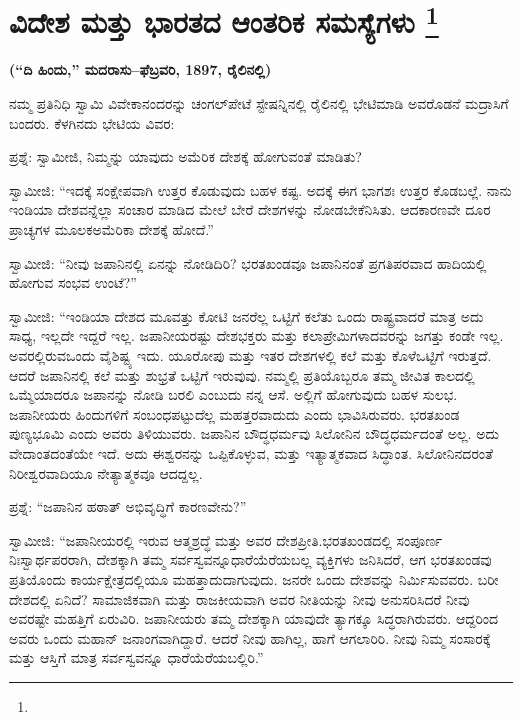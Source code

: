 
\chapter[ವಿದೇಶ ಮತ್ತು ಭಾರತದ ಆಂತರಿಕ ಸಮಸ್ಯೆಗಳು ]{ವಿದೇಶ ಮತ್ತು ಭಾರತದ ಆಂತರಿಕ ಸಮಸ್ಯೆಗಳು \protect\footnote{}}

\centerline{\textbf{(“ದಿ ಹಿಂದು,” ಮದರಾಸು–ಫೆಬ್ರವರಿ, 1897, ರೈಲಿನಲ್ಲಿ)}}

\vskip 0.4cm

ನಮ್ಮ ಪ್ರತಿನಿಧಿ ಸ್ವಾಮಿ ವಿವೇಕಾನಂದರನ್ನು ಚಂಗಲ್​ಪೇಟೆ ಸ್ಟೇಷನ್ನಿನಲ್ಲಿ ರೈಲಿನಲ್ಲಿ ಭೇಟಿಮಾಡಿ ಅವರೊಡನೆ ಮದ್ರಾಸಿಗೆ ಬಂದರು. ಕೆಳಗಿನದು ಭೇಟಿಯ ವಿವರ:

ಪ್ರಶ್ನೆ: ಸ್ವಾಮೀಜಿ, ನಿಮ್ಮನ್ನು ಯಾವುದು ಅಮೆರಿಕ ದೇಶಕ್ಕೆ ಹೋಗುವಂತೆ ಮಾಡಿತು?

ಸ್ವಾಮೀಜಿ: “ಇದಕ್ಕೆ ಸಂಕ್ಷೇಪವಾಗಿ ಉತ್ತರ ಕೊಡುವುದು ಬಹಳ ಕಷ್ಟ. ಅದಕ್ಕೆ ಈಗ ಭಾಗಶಃ ಉತ್ತರ ಕೊಡಬಲ್ಲೆ. ನಾನು ಇಂಡಿಯಾ ದೇಶವನ್ನೆಲ್ಲಾ ಸಂಚಾರ ಮಾಡಿದ ಮೇಲೆ ಬೇರೆ ದೇಶಗಳನ್ನು ನೋಡಬೇಕೆನಿಸಿತು. ಆದಕಾರಣವೇ ದೂರ ಪ್ರಾಚ್ಯಗಳ ಮೂಲಕ\break ಅಮೆರಿಕಾ ದೇಶಕ್ಕೆ ಹೋದೆ.”

ಸ್ವಾಮೀಜಿ: “ನೀವು ಜಪಾನಿನಲ್ಲಿ ಏನನ್ನು ನೋಡಿದಿರಿ? ಭರತಖಂಡವೂ ಜಪಾನಿನಂತೆ ಪ್ರಗತಿಪರವಾದ ಹಾದಿಯಲ್ಲಿ ಹೋಗುವ ಸಂಭವ ಉಂಟೆ?”

ಸ್ವಾಮೀಜಿ: “ಇಂಡಿಯಾ ದೇಶದ ಮೂವತ್ತು ಕೋಟಿ ಜನರೆಲ್ಲ ಒಟ್ಟಿಗೆ ಕಲೆತು ಒಂದು ರಾಷ್ಟ್ರವಾದರೆ ಮಾತ್ರ ಅದು ಸಾಧ್ಯ, ಇಲ್ಲದೇ ಇದ್ದರೆ ಇಲ್ಲ. ಜಪಾನೀಯರಷ್ಟು ದೇಶಭಕ್ತರು ಮತ್ತು ಕಲಾಪ್ರೇಮಿಗಳಾದವರನ್ನು ಜಗತ್ತು ಕಂಡೇ ಇಲ್ಲ. ಅವರಲ್ಲಿರುವ\break ಒಂದು ವೈಶಿಷ್ಟ್ಯ ಇದು. ಯೂರೋಪು ಮತ್ತು ಇತರ ದೇಶಗಳಲ್ಲಿ ಕಲೆ ಮತ್ತು ಕೊಳೆ\break ಒಟ್ಟಿಗೆ ಇರುತ್ತದೆ. ಆದರೆ ಜಪಾನಿನಲ್ಲಿ ಕಲೆ ಮತ್ತು ಶುಭ್ರತೆ ಒಟ್ಟಿಗೆ ಇರುವುವು. ನಮ್ಮಲ್ಲಿ ಪ್ರತಿಯೊಬ್ಬರೂ ತಮ್ಮ ಜೀವಿತ ಕಾಲದಲ್ಲಿ ಒಮ್ಮೆಯಾದರೂ ಜಪಾನನ್ನು ನೋಡಿ ಬರಲಿ ಎಂಬುದು ನನ್ನ ಆಸೆ. ಅಲ್ಲಿಗೆ ಹೋಗುವುದು ಬಹಳ ಸುಲಭ. ಜಪಾನೀಯರು ಹಿಂದುಗಳಿಗೆ ಸಂಬಂಧಪಟ್ಟುದೆಲ್ಲ ಮಹತ್ತರವಾದುದು ಎಂದು ಭಾವಿಸಿರುವರು. ಭರತಖಂಡ ಪುಣ್ಯಭೂಮಿ ಎಂದು ಅವರು ತಿಳಿಯುವರು. ಜಪಾನಿನ ಬೌದ್ಧಧರ್ಮವು ಸಿಲೋನಿನ ಬೌದ್ಧಧರ್ಮದಂತೆ ಅಲ್ಲ. ಅದು ವೇದಾಂತದಂತೆಯೇ ಇದೆ. ಅದು ಈಶ್ವರನನ್ನು ಒಪ್ಪಿಕೊಳ್ಳುವ, ಮತ್ತು ಇತ್ಯಾತ್ಮಕವಾದ ಸಿದ್ಧಾಂತ. ಸಿಲೋನಿನದರಂತೆ ನಿರೀಶ್ವರವಾದಿಯೂ ನೇತ್ಯಾತ್ಮಕವೂ ಆದದ್ದಲ್ಲ.

ಪ್ರಶ್ನೆ: “ಜಪಾನಿನ ಹಠಾತ್​ ಅಭಿವೃದ್ಧಿಗೆ ಕಾರಣವೇನು?”

ಸ್ವಾಮೀಜಿ: “ಜಪಾನೀಯರಲ್ಲಿ ಇರುವ ಆತ್ಮಶ್ರದ್ಧೆ ಮತ್ತು ಅವರ ದೇಶಪ್ರೀತಿ.\break ಭರತಖಂಡದಲ್ಲಿ ಸಂಪೂರ್ಣ ನಿಃಸ್ವಾರ್ಥಪರರಾಗಿ, ದೇಶಕ್ಕಾಗಿ ತಮ್ಮ ಸರ್ವಸ್ವವನ್ನೂ\break ಧಾರೆಯೆರೆಯಬಲ್ಲ ವ್ಯಕ್ತಿಗಳು ಜನಿಸಿದರೆ, ಆಗ ಭರತಖಂಡವು ಪ್ರತಿಯೊಂದು ಕಾರ್ಯಕ್ಷೇತ್ರದಲ್ಲಿಯೂ ಮಹತ್ತಾದುದಾಗುವುದು. ಜನರೇ ಒಂದು ದೇಶವನ್ನು ನಿರ್ಮಿಸುವವರು. ಬರೀ ದೇಶದಲ್ಲಿ ಏನಿದೆ? ಸಾಮಾಜಿಕವಾಗಿ ಮತ್ತು ರಾಜಕೀಯವಾಗಿ ಅವರ ನೀತಿಯನ್ನು ನೀವು ಅನುಸರಿಸಿದರೆ ನೀವು ಅವರಷ್ಟೇ ಮಹತ್ತಿಗೆ ಏರುವಿರಿ. ಜಪಾನೀಯರು ತಮ್ಮ ದೇಶಕ್ಕಾಗಿ ಯಾವುದೇ ತ್ಯಾಗಕ್ಕೂ ಸಿದ್ಧರಾಗಿರುವರು. ಆದ್ದರಿಂದ ಅವರು ಒಂದು ಮಹಾನ್​ ಜನಾಂಗವಾಗಿದ್ದಾರೆ. ಆದರೆ ನೀವು ಹಾಗಿಲ್ಲ, ಹಾಗೆ ಆಗಲಾರಿರಿ. ನೀವು ನಿಮ್ಮ ಸಂಸಾರಕ್ಕೆ ಮತ್ತು ಆಸ್ತಿಗೆ ಮಾತ್ರ ಸರ್ವಸ್ವವನ್ನೂ ಧಾರೆಯೆರೆಯಬಲ್ಲಿರಿ.”

